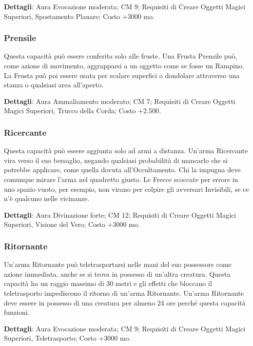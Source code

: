 \begin{multicols}{2}
\textbf{Dettagli}: Aura Evocazione moderata; CM 9; Requisiti di Creare Oggetti Magici Superiori, Spostamento Planare; Costo +3000 mo.

\subsubsection{Prensile}

Questa capacità può essere conferita solo alle fruste. Una Frusta Prensile può, come azione di movimento, aggrapparsi a un oggetto come se fosse un Rampino. La Frusta può poi essere usata per scalare superfici o dondolare attraverso una stanza o qualsiasi area all'aperto. 

\textbf{Dettagli}: Aura Ammaliamento moderato; CM 7; Requisiti di Creare Oggetti Magici Superiori, Trucco della Corda; Costo +2.500.

\subsubsection{Ricercante}

Questa capacità può essere aggiunta solo ad armi a distanza. Un'arma Ricercante vira verso il suo bersaglio, negando qualsiasi probabilità di mancarlo che si potrebbe applicare, come quella dovuta all'Occultamento. Chi la impugna deve comunque mirare l'arma nel quadretto giusto. Le Frecce scoccate per errore in uno spazio vuoto, per esempio, non virano per colpire gli avversari Invisibili, se ce n'è qualcuno nelle vicinanze.

\textbf{Dettagli}: Aura Divinazione forte; CM 12; Requisiti di Creare Oggetti Magici Superiori, Visione del Vero; Costo +3000 mo.

\subsubsection{Ritornante}

Un'arma Ritornante può teletrasportarsi nelle mani del suo possessore come azione immediata, anche se si trova in possesso di un'altra creatura. Questa capacità ha un raggio massimo di 30 metri e gli effetti che bloccano il teletrasporto impediscono il ritorno di un'arma Ritornante. Un'arma Ritornante deve essere in possesso di una creatura per almeno 24 ore perché questa capacità funzioni.

\textbf{Dettagli}: Aura Evocazione moderata; CM 9; Requisiti di Creare Oggetti Magici Superiori, Teletrasporto; Costo +3000 mo.


\end{multicols}
